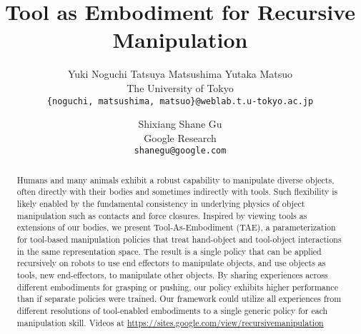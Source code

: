 \documentclass[10pt,twocolumn,letterpaper]{article}
\begin{document}
\title{Tool as Embodiment for Recursive Manipulation}

\author{Yuki Noguchi \quad Tatsuya Matsushima \quad Yutaka Matsuo\\
The University of Tokyo\\


\tt\small {\{noguchi, matsushima, matsuo\}}@weblab.t.u-tokyo.ac.jp \\


\and
Shixiang Shane Gu\\
Google Research\\
{\tt\small shanegu@google.com}
}
\maketitle

\begin{abstract}
   Humans and many animals exhibit a robust capability to manipulate diverse objects, often directly with their bodies and sometimes indirectly with tools. Such flexibility is likely enabled by the fundamental consistency in underlying physics of object manipulation such as contacts and force closures. Inspired by viewing tools as extensions of our bodies, we present Tool-As-Embodiment (TAE), a parameterization for tool-based manipulation policies that treat hand-object and tool-object interactions in the same representation space. The result is a single policy that can be applied recursively on robots to use end effectors to manipulate objects, and use objects as tools, \ie new end-effectors, to manipulate other objects. By sharing experiences across different embodiments for grasping or pushing, our policy exhibits higher performance than if separate policies were trained. Our framework could utilize all experiences from different resolutions of tool-enabled embodiments to a single generic policy for each manipulation skill. Videos at \url{https://sites.google.com/view/recursivemanipulation}
\end{abstract}
\end{document}
